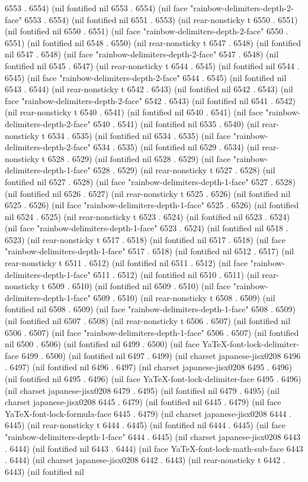 6553 . 6554) (nil fontified nil 6553 . 6554) (nil face "rainbow-delimiters-depth-2-face" 6553 . 6554) (nil fontified nil 6551 . 6553) (nil rear-nonsticky t 6550 . 6551) (nil fontified nil 6550 . 6551) (nil face "rainbow-delimiters-depth-2-face" 6550 . 6551) (nil fontified nil 6548 . 6550) (nil rear-nonsticky t 6547 . 6548) (nil fontified nil 6547 . 6548) (nil face "rainbow-delimiters-depth-2-face" 6547 . 6548) (nil fontified nil 6545 . 6547) (nil rear-nonsticky t 6544 . 6545) (nil fontified nil 6544 . 6545) (nil face "rainbow-delimiters-depth-2-face" 6544 . 6545) (nil fontified nil 6543 . 6544) (nil rear-nonsticky t 6542 . 6543) (nil fontified nil 6542 . 6543) (nil face "rainbow-delimiters-depth-2-face" 6542 . 6543) (nil fontified nil 6541 . 6542) (nil rear-nonsticky t 6540 . 6541) (nil fontified nil 6540 . 6541) (nil face "rainbow-delimiters-depth-2-face" 6540 . 6541) (nil fontified nil 6535 . 6540) (nil rear-nonsticky t 6534 . 6535) (nil fontified nil 6534 . 6535) (nil face "rainbow-delimiters-depth-2-face" 6534 . 6535) (nil fontified nil 6529 . 6534) (nil rear-nonsticky t 6528 . 6529) (nil fontified nil 6528 . 6529) (nil face "rainbow-delimiters-depth-1-face" 6528 . 6529) (nil rear-nonsticky t 6527 . 6528) (nil fontified nil 6527 . 6528) (nil face "rainbow-delimiters-depth-1-face" 6527 . 6528) (nil fontified nil 6526 . 6527) (nil rear-nonsticky t 6525 . 6526) (nil fontified nil 6525 . 6526) (nil face "rainbow-delimiters-depth-1-face" 6525 . 6526) (nil fontified nil 6524 . 6525) (nil rear-nonsticky t 6523 . 6524) (nil fontified nil 6523 . 6524) (nil face "rainbow-delimiters-depth-1-face" 6523 . 6524) (nil fontified nil 6518 . 6523) (nil rear-nonsticky t 6517 . 6518) (nil fontified nil 6517 . 6518) (nil face "rainbow-delimiters-depth-1-face" 6517 . 6518) (nil fontified nil 6512 . 6517) (nil rear-nonsticky t 6511 . 6512) (nil fontified nil 6511 . 6512) (nil face "rainbow-delimiters-depth-1-face" 6511 . 6512) (nil fontified nil 6510 . 6511) (nil rear-nonsticky t 6509 . 6510) (nil fontified nil 6509 . 6510) (nil face "rainbow-delimiters-depth-1-face" 6509 . 6510) (nil rear-nonsticky t 6508 . 6509) (nil fontified nil 6508 . 6509) (nil face "rainbow-delimiters-depth-1-face" 6508 . 6509) (nil fontified nil 6507 . 6508) (nil rear-nonsticky t 6506 . 6507) (nil fontified nil 6506 . 6507) (nil face "rainbow-delimiters-depth-1-face" 6506 . 6507) (nil fontified nil 6500 . 6506) (nil fontified nil 6499 . 6500) (nil face YaTeX-font-lock-delimiter-face 6499 . 6500) (nil fontified nil 6497 . 6499) (nil charset japanese-jisx0208 6496 . 6497) (nil fontified nil 6496 . 6497) (nil charset japanese-jisx0208 6495 . 6496) (nil fontified nil 6495 . 6496) (nil face YaTeX-font-lock-delimiter-face 6495 . 6496) (nil charset japanese-jisx0208 6479 . 6495) (nil fontified nil 6479 . 6495) (nil charset japanese-jisx0208 6445 . 6479) (nil fontified nil 6445 . 6479) (nil face YaTeX-font-lock-formula-face 6445 . 6479) (nil charset japanese-jisx0208 6444 . 6445) (nil rear-nonsticky t 6444 . 6445) (nil fontified nil 6444 . 6445) (nil face "rainbow-delimiters-depth-1-face" 6444 . 6445) (nil charset japanese-jisx0208 6443 . 6444) (nil fontified nil 6443 . 6444) (nil face YaTeX-font-lock-math-sub-face 6443 . 6444) (nil charset japanese-jisx0208 6442 . 6443) (nil rear-nonsticky t 6442 . 6443) (nil fontified nil 